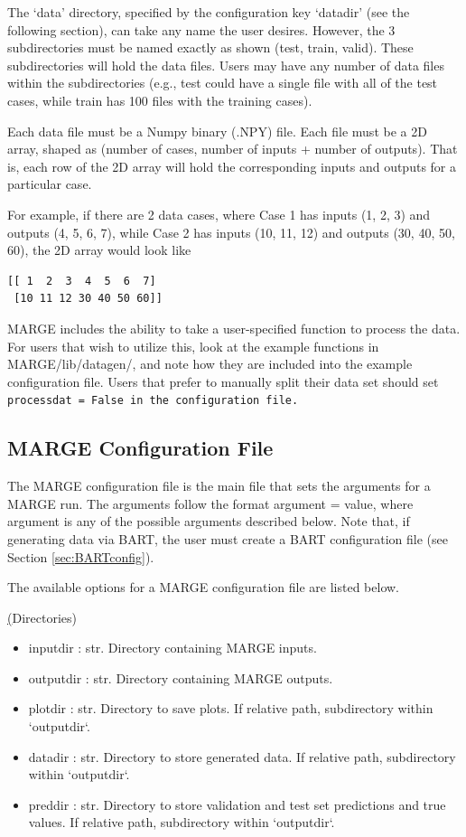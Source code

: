 \documentclass[letterpaper, 12pt]{article}
\begin{document}
\noindent The `data' directory, specified by the configuration key `datadir'
(see the following section), can take any name the user desires.  However, 
the 3 subdirectories must be named exactly as shown (test, train, 
valid).  These subdirectories will hold the data files. Users may have any 
number of data files within the subdirectories (e.g., test could have a single 
file with all of the test cases, while train has 100 files with the training 
cases). \newline

\noindent Each data file must be a Numpy binary (.NPY) file.  Each file must 
be a 2D array, shaped as (number of cases, number of inputs + number of 
outputs).  That is, each row of the 2D array will hold the corresponding 
inputs and outputs for a particular case. \newline

\noindent For example, if there are 2 data cases, 
where Case 1 has inputs (1, 2, 3) and outputs (4, 5, 6, 7), while Case 2 has 
inputs (10, 11, 12) and outputs (30, 40, 50, 60), the 2D array would look like 
\begin{verbatim}
[[ 1  2  3  4  5  6  7]
 [10 11 12 30 40 50 60]]
\end{verbatim}

\noindent MARGE includes the ability to take a user-specified function to 
process the data.  For users that wish to utilize this, look at the example 
functions in MARGE/lib/datagen/, and note how they are included into the 
example configuration file.  Users that prefer to manually split their 
data set should set \tt{processdat = False} in the configuration file.


\subsection{MARGE Configuration File}
\label{sec:config}
The MARGE configuration file is the main file that sets the arguments for a 
MARGE run. The arguments follow the format {\ttb argument = value}, where 
{\ttb argument} is any of the possible arguments described below. Note that, 
if generating data via BART, the user must create a BART configuration file 
(see Section \ref{sec:BARTconfig}).

\noindent The available options for a MARGE configuration file are listed below.

\noindent \underline(Directories)
\begin{itemize}
\item inputdir   : str.  Directory containing MARGE inputs.
\item outputdir  : str.  Directory containing MARGE outputs.
\item plotdir    : str.  Directory to save plots. 
                         If relative path, subdirectory within `outputdir`.
\item datadir    : str.  Directory to store generated data. 
                         If relative path, subdirectory within `outputdir`.
\item preddir    : str.  Directory to store validation and test set predictions and true values. 
                         If relative path, subdirectory within `outputdir`.
\end{itemize}
\end{document}
